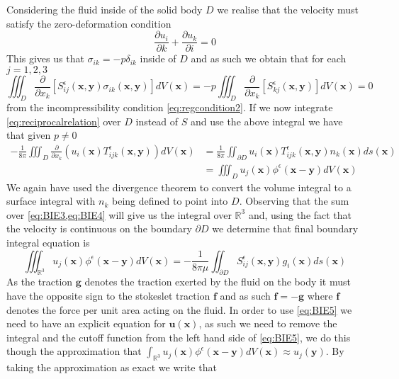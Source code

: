 Considering the fluid inside of the solid body $D$ we realise that the velocity must satisfy the zero-deformation condition
\begin{equation*}
  \frac{\partial u_i}{\partial k} + \frac{\partial u_k}{\partial i} = 0
\end{equation*}
This gives us that $\sigma_{ik} = -p\delta_{ik}$ inside of $D$ and as such we obtain that for each $j=1,2,3$
\begin{equation*}
  \iiint_{D} \frac{\partial}{\partial x_k}\left[S^\epsilon_{ij}\left(\bm{x}, \bm{y}\right)\sigma_{ik}\left(\bm{x}, \bm{y}\right)\right]dV(\bm{x}) = -p\iiint_{D} \frac{\partial}{\partial x_k}\left[S^\epsilon_{kj}\left(\bm{x}, \bm{y}\right)\right]dV(\bm{x}) = 0
\end{equation*}
from the incompressibility condition \cref{eq:regcondition2}. If we now integrate \cref{eq:reciprocalrelation} over $D$ instead of $S$ and use the above integral we have that given $p \neq 0$
\begin{equation}
\begin{aligned}
    \label{eq:BIE4}
    -\frac{1}{8\pi}\iiint_{D} \frac{\partial}{\partial x_k}\left(u_i(\bm{x})T^\epsilon_{ijk}\left(\bm{x}, \bm{y}\right) \right) dV(\bm{x}) &= \frac{1}{8\pi}\iint_{\partial D} u_i(\bm{x})T^\epsilon_{ijk}\left(\bm{x}, \bm{y}\right)n_k(\bm{x}) ds(\bm{x})\\
    &= \iiint_D u_j(\bm{x}) \phi^\epsilon(\bm{x}-\bm{y}) dV(\bm{x})
\end{aligned}
\end{equation}
We again have used the divergence theorem to convert the volume integral to a surface integral with $n_k$ being defined to point into $D$. Observing that the sum over \cref{eq:BIE3,eq:BIE4} will give us the integral over $\mathbb{R}^{3}$ and, using the fact that the velocity is continuous on the boundary $\partial D$ we determine that final boundary integral equation is
\begin{equation}
  \label{eq:BIE5}
    \iiint_{\mathbb{R}^{3}} u_{j}(\bm{x}) \phi^{\epsilon}\left(\bm{x}-\bm{y}\right) d V(\bm{x})=-\frac{1}{8 \pi \mu} \iint_{\partial D} S_{i j}^{\epsilon}\left(\bm{x}, \bm{y}\right) g_{i}(\bm{x}) d s(\bm{x})
\end{equation}
As the traction $\bm{g}$ denotes the traction exerted by the fluid on the body it must have the opposite sign to the stokeslet traction $\bm{f}$ and as such $\bm{f} = -\bm{g}$ where $\bm{f}$ denotes the force per unit area acting on the fluid. In order to use \cref{eq:BIE5} we need to have an explicit equation for $\bm{u}(\bm{x})$, as such we need to remove the integral and the cutoff function from the left hand side of \cref{eq:BIE5}, we do this though the approximation that $\int_{\mathbb{R}^{3}} u_{j}(\bm{x}) \phi^{\epsilon}\left(\bm{x}-\bm{y}\right) d V(\bm{x}) \approx u_j(\bm{y})$. By taking the approximation as exact we write that 
